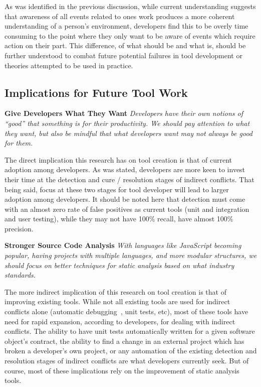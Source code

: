 \documentclass[conference]{IEEEtran}
\begin{document}
As was identified in the previous discussion, while current understanding suggests that awareness of all events related to ones work
produces a more coherent understanding of a person's environment, developers find this to be overly time consuming
to the point where they only want to be aware of events which require action on their part. This difference, of what
should be and what is, should be further understood to combat future potential failures in
tool development or theories attempted to be used in practice.

\subsection{Implications for Future Tool Work}
\label{sec:implt}

\textbf{Give Developers What They Want} \textit{Developers have their own notions of ``good''
that something is for their productivity. We should pay attention to what they want, but also be mindful that what
developers want may not always be good for them.}

The direct implication this research has on tool creation is that of current adoption among developers. As was stated,
developers are more keen to invest their time at the detection and cure / resolution stages of indirect conflicts. That being
said, focus at these two stages for tool developer will lead to larger adoption among developers.
It should be noted here that detection must come with an almost zero rate of false positives as
current tools (unit and integration and user testing), while they may not have 100\% recall, have almost 100\% precision.

\textbf{Stronger Source Code Analysis} \textit{With languages like JavaScript becoming popular, having projects with
multiple languages, and more modular structures, we should focus on better techniques for static analysis based
on what industry standards.}

The more indirect implication of this research on tool creation is that of improving existing tools. While not all existing
tools are used for indirect conflicts alone (automatic debugging~\cite{Zeller:2005:WPF}, unit tests, etc), most of these tools
have need for rapid expansion, according to developers, for dealing with indirect conflicts. The ability to have unit tests
automatically written for a given software object's contract, the ability to find a change  in an external project
which has broken a developer's own project, or any automation of the existing detection and resolution stages of indirect
conflicts are what developers currently seek. But of course, most of these implications rely on the improvement of
static analysis tools.
\end{document}

